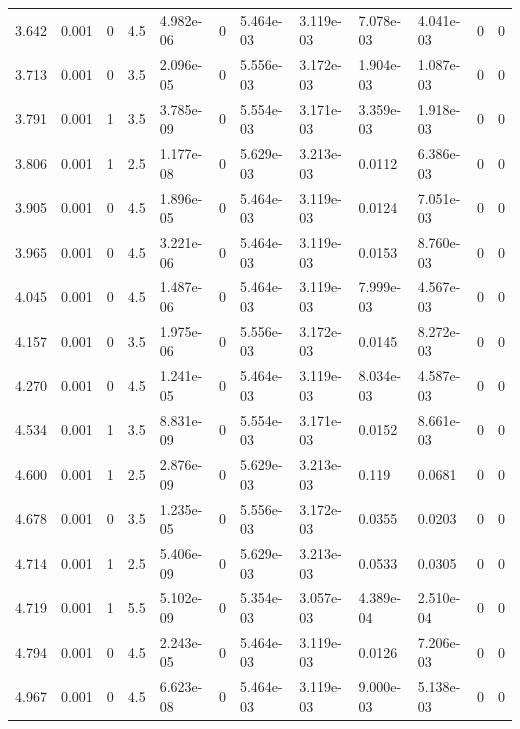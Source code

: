 \documentclass[preview]{standalone}
\begin{document}
{{\begin{tabular}{L{1.2cm}C{1.2cm} C{0.3cm}C{0.5cm} C{1.4cm}C{1.4cm} C{1.4cm}C{1.4cm} C{1.6cm}C{1.6cm} C{1.6cm}C{1.6cm}}
  3.642  &  0.001  & 0     & 4.5 &  4.982e-06  & 0  &  5.464e-03&   3.119e-03& 7.078e-03 & 4.041e-03   &  0 & 0  \\ 
  3.713  &  0.001  & 0     & 3.5 &  2.096e-05  & 0  &  5.556e-03&   3.172e-03& 1.904e-03 & 1.087e-03   &  0 & 0  \\ 
  3.791  &  0.001  & 1     & 3.5 &  3.785e-09  & 0  &  5.554e-03&   3.171e-03& 3.359e-03 & 1.918e-03   &  0 & 0  \\ 
  3.806  &  0.001  & 1     & 2.5 &  1.177e-08  & 0  &  5.629e-03&   3.213e-03& 0.0112 & 6.386e-03   &  0 & 0  \\ 
  3.905  &  0.001  & 0     & 4.5 &  1.896e-05  & 0  &  5.464e-03&   3.119e-03& 0.0124 & 7.051e-03   &  0 & 0  \\ 
  3.965  &  0.001  & 0     & 4.5 &  3.221e-06  & 0  &  5.464e-03&   3.119e-03& 0.0153 & 8.760e-03   &  0 & 0  \\ 
  4.045  &  0.001  & 0     & 4.5 &  1.487e-06  & 0  &  5.464e-03&   3.119e-03& 7.999e-03 & 4.567e-03   &  0 & 0  \\ 
  4.157  &  0.001  & 0     & 3.5 &  1.975e-06  & 0  &  5.556e-03&   3.172e-03& 0.0145 & 8.272e-03   &  0 & 0  \\ 
  4.270  &  0.001  & 0     & 4.5 &  1.241e-05  & 0  &  5.464e-03&   3.119e-03& 8.034e-03 & 4.587e-03   &  0 & 0  \\ 
  4.534  &  0.001  & 1     & 3.5 &  8.831e-09  & 0  &  5.554e-03&   3.171e-03& 0.0152 & 8.661e-03   &  0 & 0  \\ 
  4.600  &  0.001  & 1     & 2.5 &  2.876e-09  & 0  &  5.629e-03&   3.213e-03& 0.119 & 0.0681   &  0 & 0  \\ 
  4.678  &  0.001  & 0     & 3.5 &  1.235e-05  & 0  &  5.556e-03&   3.172e-03& 0.0355 & 0.0203   &  0 & 0  \\ 
  4.714  &  0.001  & 1     & 2.5 &  5.406e-09  & 0  &  5.629e-03&   3.213e-03& 0.0533 & 0.0305   &  0 & 0  \\ 
  4.719  &  0.001  & 1     & 5.5 &  5.102e-09  & 0  &  5.354e-03&   3.057e-03& 4.389e-04 & 2.510e-04   &  0 & 0  \\ 
  4.794  &  0.001  & 0     & 4.5 &  2.243e-05  & 0  &  5.464e-03&   3.119e-03& 0.0126 & 7.206e-03   &  0 & 0  \\ 
  4.967  &  0.001  & 0     & 4.5 &  6.623e-08  & 0  &  5.464e-03&   3.119e-03& 9.000e-03 & 5.138e-03   &  0 & 0  \\ 
\hline 
\end{tabular} 

}}
\end{document}
